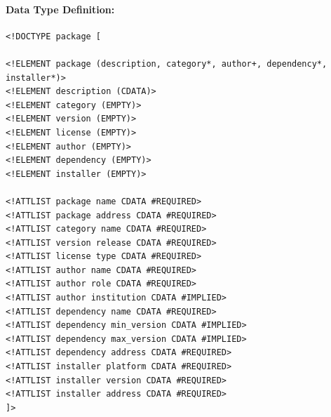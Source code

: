 \documentclass[12pt,a4paper]{article}
\begin{document}
\paragraph{Data Type Definition:}
\begin{verbatim}
<!DOCTYPE package [

<!ELEMENT package (description, category*, author+, dependency*, 
installer*)>
<!ELEMENT description (CDATA)>
<!ELEMENT category (EMPTY)>
<!ELEMENT version (EMPTY)>
<!ELEMENT license (EMPTY)>
<!ELEMENT author (EMPTY)>
<!ELEMENT dependency (EMPTY)>
<!ELEMENT installer (EMPTY)>

<!ATTLIST package name CDATA #REQUIRED>
<!ATTLIST package address CDATA #REQUIRED>
<!ATTLIST category name CDATA #REQUIRED>
<!ATTLIST version release CDATA #REQUIRED>
<!ATTLIST license type CDATA #REQUIRED>
<!ATTLIST author name CDATA #REQUIRED>
<!ATTLIST author role CDATA #REQUIRED>
<!ATTLIST author institution CDATA #IMPLIED>
<!ATTLIST dependency name CDATA #REQUIRED>
<!ATTLIST dependency min_version CDATA #IMPLIED>
<!ATTLIST dependency max_version CDATA #IMPLIED>
<!ATTLIST dependency address CDATA #REQUIRED>
<!ATTLIST installer platform CDATA #REQUIRED>
<!ATTLIST installer version CDATA #REQUIRED>
<!ATTLIST installer address CDATA #REQUIRED>
]>
\end{verbatim}
\end{document}
